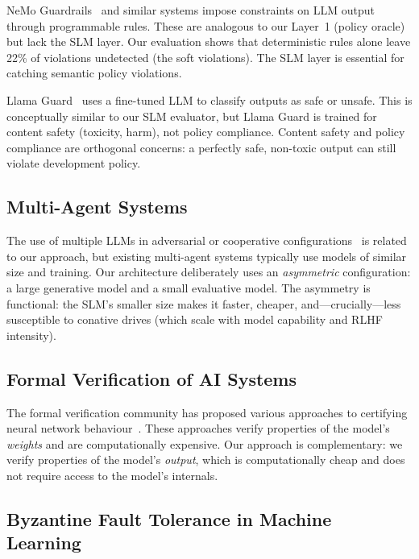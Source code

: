 \documentclass[11pt,a4paper]{article}
\begin{document}
NeMo Guardrails~\citep{rebedea2023nemo} and similar systems impose
constraints on LLM output through programmable rules.  These are
analogous to our Layer~1 (policy oracle) but lack the SLM layer.
Our evaluation shows that deterministic rules alone leave 22\% of
violations undetected (the soft violations).  The SLM layer is
essential for catching semantic policy violations.

Llama Guard~\citep{inan2023llama} uses a fine-tuned LLM to classify
outputs as safe or unsafe.  This is conceptually similar to our SLM
evaluator, but Llama Guard is trained for content safety (toxicity,
harm), not policy compliance.  Content safety and policy compliance
are orthogonal concerns: a perfectly safe, non-toxic output can
still violate development policy.

\subsection{Multi-Agent Systems}

The use of multiple LLMs in adversarial or cooperative
configurations~\citep{du2023improving,liang2023encouraging} is related
to our approach, but existing multi-agent systems typically use
models of similar size and training.  Our architecture deliberately
uses an \emph{asymmetric} configuration: a large generative model
and a small evaluative model.  The asymmetry is functional: the
SLM's smaller size makes it faster, cheaper, and---crucially---less
susceptible to conative drives (which scale with model capability
and RLHF intensity).

\subsection{Formal Verification of AI Systems}

The formal verification community has proposed various approaches
to certifying neural network behaviour~\citep{katz2017reluplex,
huang2017safety}.  These approaches verify properties of the
model's \emph{weights} and are computationally expensive.  Our
approach is complementary: we verify properties of the model's
\emph{output}, which is computationally cheap and does not require
access to the model's internals.

\subsection{Byzantine Fault Tolerance in Machine Learning}
\end{document}
